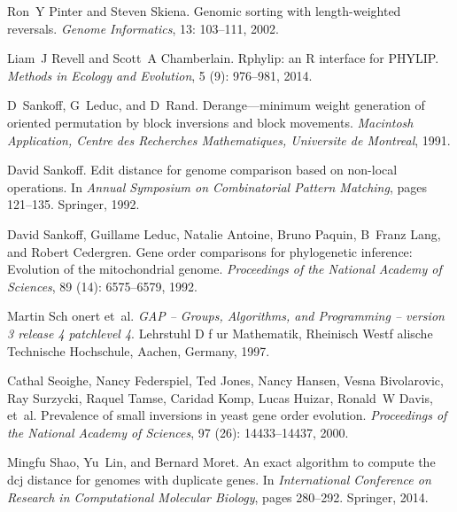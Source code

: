 \documentclass[utf8]{Frontiers_LaTex_Templates/frontiersFPHY} %
\numberwithin{equation}{section}
\begin{document}
\begin{thebibliography}{38}
Ron~Y Pinter and Steven Skiena.
\newblock Genomic sorting with length-weighted reversals.
\newblock \emph{Genome Informatics}, 13: 103--111, 2002.

Liam~J Revell and Scott~A Chamberlain.
\newblock Rphylip: an {R} interface for {PHYLIP}.
\newblock \emph{Methods in Ecology and Evolution}, 5 (9):
  976--981, 2014.

D~Sankoff, G~Leduc, and D~Rand.
\newblock Derange---minimum weight generation of oriented permutation by block
  inversions and block movements.
\newblock \emph{Macintosh Application, Centre des Recherches Mathematiques,
  Universite de Montreal}, 1991.

David Sankoff.
\newblock Edit distance for genome comparison based on non-local operations.
\newblock In \emph{Annual Symposium on Combinatorial Pattern Matching}, pages
  121--135. Springer, 1992.

David Sankoff, Guillame Leduc, Natalie Antoine, Bruno Paquin, B~Franz Lang, and
  Robert Cedergren.
\newblock Gene order comparisons for phylogenetic inference: {E}volution of the
  mitochondrial genome.
\newblock \emph{Proceedings of the National Academy of Sciences}, 89
  (14): 6575--6579, 1992.

Martin Sch{ o}nert et~al.
\newblock \emph{{GAP} -- {Groups}, {Algorithms}, and {Programming} -- version 3
  release 4 patchlevel 4}.
\newblock Lehrstuhl D f{ u}r Mathematik, Rheinisch Westf{
  a}lische Technische Hoch\-schule, Aachen, Germany, 1997.

Cathal Seoighe, Nancy Federspiel, Ted Jones, Nancy Hansen, Vesna Bivolarovic,
  Ray Surzycki, Raquel Tamse, Caridad Komp, Lucas Huizar, Ronald~W Davis,
  et~al.
\newblock Prevalence of small inversions in yeast gene order evolution.
\newblock \emph{Proceedings of the National Academy of Sciences}, 97
  (26): 14433--14437, 2000.

Mingfu Shao, Yu~Lin, and Bernard Moret.
\newblock An exact algorithm to compute the dcj distance for genomes with
  duplicate genes.
\newblock In \emph{International Conference on Research in Computational
  Molecular Biology}, pages 280--292. Springer, 2014.


\end{thebibliography}
\end{document}

